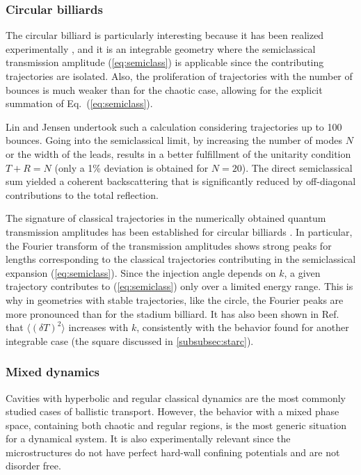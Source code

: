 \documentclass[a4paper,10pt]{article}
\newcommand{\nin}{\noindent}
\newcommand{\dlT}{\delta T}
\begin{document}
\subsubsection{Circular billiards}
\label{subsubsec:cb}

\nin The circular billiard is particularly interesting because it has been
realized experimentally 
\cite{Mar92,Chaos,chang94,persson,lee97}, and it is an integrable geometry where the semiclassical transmission amplitude (\ref{eq:semiclass}) is applicable since the contributing trajectories are isolated. Also, the proliferation of trajectories with the number of bounces is much weaker than for the chaotic case, allowing for the explicit summation of Eq.~(\ref{eq:semiclass}). 

\nin Lin and Jensen \cite{LinJen} undertook such a calculation considering trajectories up to 100 bounces. Going into the semiclassical limit, by increasing the number of modes $N$ or the width of the leads, results in a better fulfillment of the unitarity condition $T\!+\!R=N$ (only a 1\% deviation is obtained for $N\!=\!20$). The direct semiclassical sum yielded a coherent backscattering that is significantly reduced by off-diagonal contributions to the total reflection.

\nin The signature of classical trajectories in the numerically obtained
quantum transmission amplitudes has been established for circular 
billiards \cite{ishio95,schwi96,ingold}. In particular,
the Fourier transform of the transmission amplitudes shows strong
peaks for lengths corresponding to the classical trajectories
contributing in the semiclassical expansion (\ref{eq:semiclass}).
Since the injection angle depends on $k$, a given trajectory contributes to (\ref{eq:semiclass}) only over a limited energy range. This is why in geometries with stable
trajectories, like the circle, the Fourier peaks are more pronounced than
for the stadium billiard. It has also been shown in Ref.~\cite{ishio95} 
that $\langle(\dlT)^2\rangle$ increases with $k$, consistently with the behavior found for another integrable case (the square discussed in \ref{subsubsec:starc}).

\subsubsection{Mixed dynamics}
\label{subsubsec:md}

\nin Cavities with hyperbolic and regular classical dynamics are the most commonly studied cases of ballistic transport. However, the behavior with a mixed phase space, containing both chaotic and regular regions, is the most generic situation for a dynamical system. It is also experimentally
relevant since the microstructures do not have perfect hard-wall confining potentials and are not disorder free.
\end{document}
